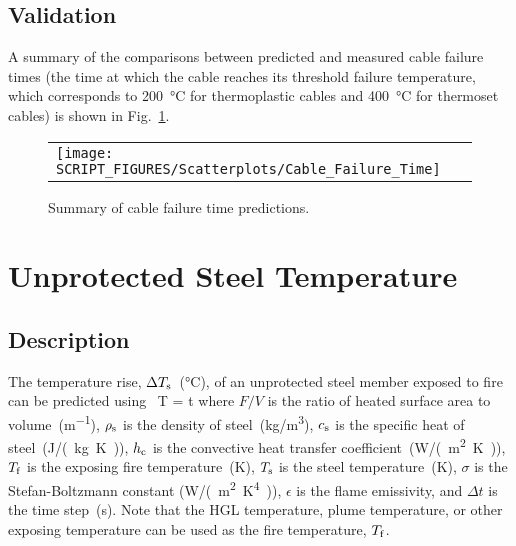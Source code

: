 \clearpage


\subsection*{Validation}

A summary of the comparisons between predicted and measured cable failure times (the time at which the cable reaches its threshold failure temperature, which corresponds to \SI{200}{\celsius} for thermoplastic cables and \SI{400}{\celsius} for thermoset cables) is shown in Fig.~\ref{Cable Failure Time (THIEF)}.

\begin{figure}[!ht]
\begin{center}
\begin{tabular}{l}
\texttt{[image: SCRIPT\_FIGURES/Scatterplots/Cable\_Failure\_Time]}
\end{tabular}
\end{center}
\caption[Summary of cable failure time predictions]
{Summary of cable failure time predictions.}
\label{Cable Failure Time (THIEF)}
\end{figure}

\clearpage


\section{Unprotected Steel Temperature}
\label{sec:Unprotected_Steel_Temperature}

\subsection*{Description}

The temperature rise, $\Delta T\sb{s}$~(\si{\celsius}), of an unprotected steel member exposed to fire can be predicted using~\cite{SFPE:Milke2}
\be
\Delta T =    \Delta t
\label{eq:unprotected_steel}
\ee
where $F/V$ is the ratio of heated surface area to volume~(\si{m^{-1}}), $\rho\sb{s}$ is the density of steel~(\si{kg/m^3}), $c\sb{s}$ is the specific heat of steel~(\si{J/(kg.K)}), $h\sb{c}$ is the convective heat transfer coefficient~(\si{W/(m^2.K)}), $T\sb{f}$ is the exposing fire temperature~(\si{K}), $T\sb{s}$ is the steel temperature~(\si{K}), $\sigma$ is the Stefan-Boltzmann constant (\si{W/(m^2.K^4)}), $\epsilon$ is the flame emissivity, and $\Delta t$ is the time step~(\si{s}). Note that the HGL temperature, plume temperature, or other exposing temperature can be used as the fire temperature, $T\sb{f}$.


